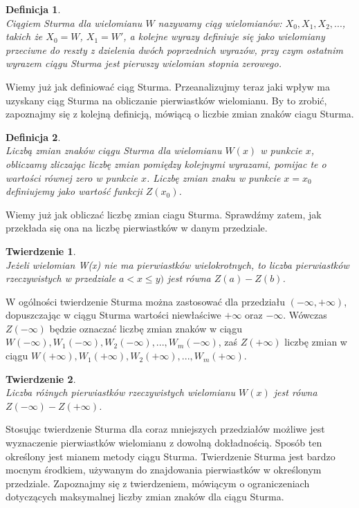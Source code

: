 \documentclass[oneside,a4paper]{book}
\newtheorem{theorem}{Twierdzenie}
\newtheorem{definition}{Definicja}
\begin{document}
	\begin{definition}
		$ $ \\
		Ciągiem Sturma dla wielomianu $W$ nazywamy ciąg wielomianów: $X_0, X_1, X_2,...$, takich że $X_0=W$, $X_1=W'$, a kolejne wyrazy definiuje się jako wielomiany przeciwne do reszty z dzielenia dwóch poprzednich wyrazów, przy czym ostatnim wyrazem ciągu Sturma jest pierwszy wielomian stopnia zerowego. 
	\end{definition}
	
	Wiemy już jak definiować ciąg Sturma. Przeanalizujmy teraz jaki wpływ ma uzyskany ciąg Sturma na obliczanie pierwiastków wielomianu. By to zrobić, zapoznajmy się z kolejną definicją, mówiącą o liczbie zmian znaków ciagu Sturma.
	
	\begin{definition}
		$ $ \\
		Liczbą zmian znaków ciągu Sturma dla wielomianu $W(x)$ w punkcie $x$, obliczamy zliczając liczbę zmian pomiędzy kolejnymi wyrazami, pomijac te o wartości równej zero w punkcie $x$. Liczbę zmian znaku w punkcie $x=x_0$ definiujemy jako wartość funkcji $Z(x_0)$.
	\end{definition}
	
	Wiemy już jak obliczać liczbę zmian ciagu Sturma. Sprawdźmy zatem, jak przekłada się ona na liczbę pierwiastków w danym przedziale.
	
	\begin{theorem}
		$ $ \\
		Jeżeli wielomian W(x) nie ma pierwiastków wielokrotnych, to liczba pierwiastków rzeczywistych w przedziale $a<x\le y)$ jest równa $Z(a) - Z(b)$.
	\end{theorem}
	
	W ogólności twierdzenie Sturma można zastosować dla przedziału $(-\infty,+\infty)$, dopuszczając w ciągu Sturma wartości niewłaściwe $+\infty$ oraz $-\infty$. Wówczas $Z(-\infty)$ będzie oznaczać liczbę zmian znaków w ciągu $W(-\infty), W_1(-\infty), W_2(-\infty),..., W_m(-\infty)$, zaś $Z(+\infty)$ liczbę zmian w ciągu $W(+\infty), W_1(+\infty), W_2(+\infty),..., W_m(+\infty)$.
	
	\begin{theorem}
		$ $ \\
		Liczba różnych pierwiastków rzeczywistych wielomianu $W(x)$ jest równa $Z(-\infty)-Z(+\infty)$.
	\end{theorem}
	
	Stosując twierdzenie Sturma dla coraz mniejszych przedziałów możliwe jest wyznaczenie pierwiastków wielomianu z dowolną dokładnością. Sposób ten określony jest mianem metody ciągu Sturma.
	Twierdzenie Sturma jest bardzo mocnym środkiem, używanym do znajdowania pierwiastków w określonym przedziale. Zapoznajmy się z twierdzeniem, mówiącym o ograniczeniach dotyczących maksymalnej liczby zmian znaków dla ciągu Sturma.
	
\end{document}
